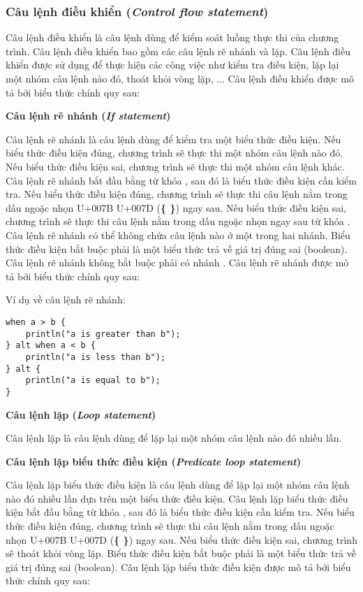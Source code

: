 \subsubsection{Câu lệnh điều khiển (\textit{Control flow statement})}

    Câu lệnh điều khiển là câu lệnh dùng để kiểm soát luồng thực thi của chương trình. Câu lệnh điều khiển bao gồm các câu lệnh rẽ nhánh và lặp. Câu lệnh điều khiển được sử dụng để thực hiện các công việc như kiểm tra điều kiện, lặp lại một nhóm câu lệnh nào đó, thoát khỏi vòng lặp, ... Câu lệnh điều khiển được mô tả bởi biểu thức chính quy sau:

\regexctrlstmt

\noindent\textbf{\label{ch2:if_stmt}Câu lệnh rẽ nhánh (\textit{If statement})}

    Câu lệnh rẽ nhánh là câu lệnh dùng để kiểm tra một biểu thức điều kiện. Nếu biểu thức điều kiện đúng, chương trình sẽ thực thi một nhóm câu lệnh nào đó. Nếu biểu thức điều kiện sai, chương trình sẽ thực thi một nhóm câu lệnh khác. Câu lệnh rẽ nhánh bắt đầu bằng từ khóa , sau đó là biểu thức điều kiện cần kiểm tra. Nếu biểu thức điều kiện đúng, chương trình sẽ thực thi câu lệnh nằm trong dấu ngoặc nhọn U+007B U+007D (\textbf{\{ \}}) ngay sau. Nếu biểu thức điều kiện sai, chương trình sẽ thực thi câu lệnh nằm trong dấu ngoặc nhọn ngay sau từ khóa . Câu lệnh rẽ nhánh có thể không chứa câu lệnh nào ở một trong hai nhánh. Biểu thức điều kiện bắt buộc phải là một biểu thức trả về giá trị đúng sai (boolean). Câu lệnh rẽ nhánh không bắt buộc phải có nhánh . Câu lệnh rẽ nhánh được mô tả bởi biểu thức chính quy sau:

\regexifstmt

\noindent Ví dụ về câu lệnh rẽ nhánh:
\begin{lstlisting}[]
when a > b {
    println("a is greater than b");
} alt when a < b {
    println("a is less than b");
} alt {
    println("a is equal to b");
}
\end{lstlisting}

\noindent\textbf{Câu lệnh lặp (\textit{Loop statement})}

Câu lệnh lặp là câu lệnh dùng để lặp lại một nhóm câu lệnh nào đó nhiều lần.

\regexloopstmt

\noindent\textbf{\label{ch2:while_stmt}Câu lệnh lặp biểu thức điều kiện (\textit{Predicate loop statement})}

    Câu lệnh lặp biểu thức điều kiện là câu lệnh dùng để lặp lại một nhóm câu lệnh nào đó nhiều lần dựa trên một biểu thức điều kiện. Câu lệnh lặp biểu thức điều kiện bắt đầu bằng từ khóa , sau đó là biểu thức điều kiện cần kiểm tra. Nếu biểu thức điều kiện đúng, chương trình sẽ thực thi câu lệnh nằm trong dấu ngoặc nhọn U+007B U+007D (\textbf{\{ \}}) ngay sau. Nếu biểu thức điều kiện sai, chương trình sẽ thoát khỏi vòng lặp. Biểu thức điều kiện bắt buộc phải là một biểu thức trả về giá trị đúng sai (boolean). Câu lệnh lặp biểu thức điều kiện được mô tả bởi biểu thức chính quy sau:


